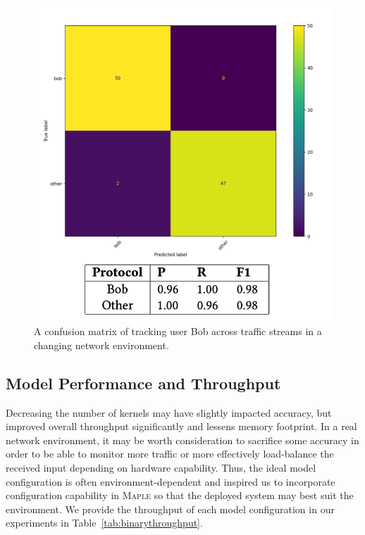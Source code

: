 \begin{figure} [ht!]
\centering
\includegraphics[scale=0.7]{chapters/5/img/userbob.png}
\caption{A confusion matrix of tracking user Bob across traffic streams in a changing network environment.}
\label{fig:userbob}
\end{figure}

\subsection{Model Performance and Throughput}
Decreasing the number of kernels may have slightly impacted accuracy, but improved overall throughput significantly and lessens memory footprint. In a real network environment, it may be worth consideration to sacrifice some accuracy in order to be able to monitor more traffic or more effectively load-balance the received input depending on hardware capability. Thus, the ideal model configuration is often environment-dependent and inspired us to incorporate configuration capability in \textsc{Maple} so that the deployed system may best suit the environment. We provide the throughput of each model configuration in our experiments in Table~\ref{tab:binarythroughput}.
